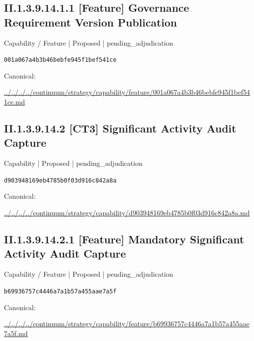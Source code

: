 \documentclass[10pt,a4paper]{article}
\begin{document}
\subsection*{II.1.3.9.14.1.1 [Feature] Governance Requirement Version Publication}
\label{element-001a067a4b3b46bebfe945f1bef541ce}
{\small Capability / Feature | Proposed | pending\_adjudication}\par
\texttt{001a067a4b3b46bebfe945f1bef541ce}\par
Canonical: \par
{\footnotesize\url{../../../../continuum/strategy/capability/feature/001a067a4b3b46bebfe945f1bef541ce.md}}\par
\subsection*{II.1.3.9.14.2 [CT3] Significant Activity Audit Capture}
\label{element-d903948169eb4785b0f03d916c842a8a}
{\small Capability | Proposed | pending\_adjudication}\par
\texttt{d903948169eb4785b0f03d916c842a8a}\par
Canonical: \par
{\footnotesize\url{../../../../continuum/strategy/capability/d903948169eb4785b0f03d916c842a8a.md}}\par
\subsection*{II.1.3.9.14.2.1 [Feature] Mandatory Significant Activity Audit Capture}
\label{element-b69936757c4446a7a1b57a455aae7a5f}
{\small Capability / Feature | Proposed | pending\_adjudication}\par
\texttt{b69936757c4446a7a1b57a455aae7a5f}\par
Canonical: \par
{\footnotesize\url{../../../../continuum/strategy/capability/feature/b69936757c4446a7a1b57a455aae7a5f.md}}\par
\end{document}
